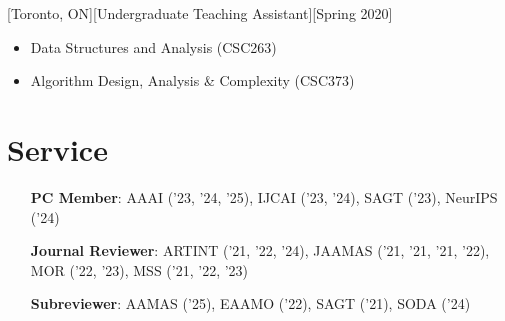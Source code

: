 \documentclass{article}
\begin{document}
    [Toronto, ON][Undergraduate Teaching Assistant][Spring 2020]
    \begin{itemize}
        \item Data Structures and Analysis (CSC263)
        \item Algorithm Design, Analysis \& Complexity (CSC373)
    \end{itemize}
    
    \section{Service}
    \begin{enumerate}[align=left]
    	\item[\textbf{PC Member}:] AAAI ('23, '24, '25), IJCAI ('23, '24), SAGT ('23), NeurIPS ('24)
    	\item[\textbf{Journal Reviewer}:] ARTINT ('21, '22, '24), JAAMAS ('21, '21, '21, '22), MOR ('22, '23), MSS ('21, '22, '23)
    	\item[\textbf{Subreviewer}:] AAMAS ('25), EAAMO ('22), SAGT ('21), SODA ('24)
    \end{enumerate}
    
\end{document}
